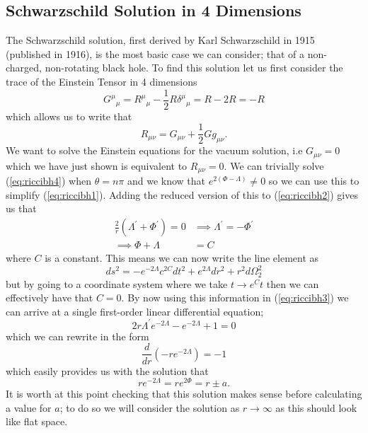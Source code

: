 \documentclass[12pt]{article}
\numberwithin{equation}{section}
\numberwithin{figure}{section}
\begin{document}
\subsection{Schwarzschild Solution in 4 Dimensions} %
\label{sub:schwarzschild_solution}
The Schwarzschild solution, first derived by Karl Schwarzschild in 1915 (published in 1916), is the most basic case we can consider; that of a non-charged, non-rotating black hole. To find this solution let us first consider the trace of the Einstein Tensor in 4 dimensions
\begin{equation}
	{G^\mu}_\mu = {R^\mu}_\mu- \frac{1}{2}R {\delta^\mu}_\mu = R- 2R =-R
\end{equation}
which allows us to write that 
\begin{equation}
	R_{\mu\nu}=G_{\mu\nu}+\frac{1}{2}G g_{\mu\nu}.
\end{equation}
We want to solve the Einstein equations for the vacuum solution, i.e $G_{\mu\nu}=0$ which we have just shown is equivalent to $R_{\mu\nu}=0$. We can trivially solve (\ref{eq:riccibh4}) when $\theta=n\pi$ and we know that $e^{2(\Phi-\Lambda)}\ne0$ so we can use this to simplify (\ref{eq:riccibh1}). Adding the reduced version of this to (\ref{eq:riccibh2}) gives us that
\begin{align}
	\frac{2}{r}(\Lambda^\prime+\Phi^\prime)=0 &\implies \Lambda^\prime = - \Phi^\prime\\
	\implies \Phi + \Lambda &= C
\end{align}
where $C$ is a constant. This means we can now write the line element as 
\begin{equation}
	ds^2 =-e^{-2\Lambda}c^{2C}dt^2 + e^{2\Lambda}dr^2 + r^2 d{\Omega}^2_{2}
\end{equation}
but by going to a coordinate system where we take $t\to e^Ct$ then we can effectively have that $C=0$. By now using this information in (\ref{eq:riccibh3}) we can arrive at a single first-order linear differential equation;
\begin{equation}
	2r\Lambda^\prime e^{-2\Lambda} - e^{-2\Lambda} +1 = 0
\end{equation}
which we can rewrite in the form
\begin{equation}
	\frac{d}{dr}(-re^{-2\Lambda}) =-1
\end{equation}
which easily provides us with the solution that
\begin{equation}
	re^{-2\Lambda}=re^{2\Phi}= r \pm a.
\end{equation}
It is worth at this point checking that this solution makes sense before calculating a value for $a$; to do so we will consider the solution as $r\to \infty$ as this should look like flat space. 
\end{document}

